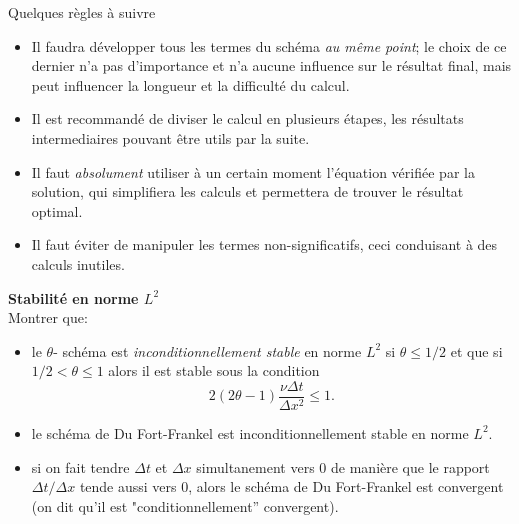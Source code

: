 \documentclass[12pt,a4paper]{article}
\begin{document}
\begin{enumerate}
Quelques r\`egles \`a suivre 
\begin{itemize}
\item Il faudra d\'evelopper tous les termes du sch\'ema {\it au
    m\^eme point}; le choix de ce dernier n'a pas d'importance et n'a
  aucune influence sur le r\'esultat final, mais peut influencer la
  longueur et la difficult\'e du calcul.
\item Il est recommand\'e de diviser le calcul en plusieurs \'etapes,
  les r\'esultats intermediaires pouvant \^etre utils par la suite.
\item Il faut {\it absolument} utiliser \`a un certain moment
  l'\'equation v\'erifi\'ee par la solution, qui simplifiera les
  calculs et permettera de trouver le r\'esultat optimal.
\item Il faut \'eviter de manipuler les termes non-significatifs, ceci
  conduisant \`a des calculs inutiles.
\end{itemize}

{\bf Stabilit\'e en norme $L^2$}\\
Montrer que:
\begin{itemize}
\item le $\theta$- sch\'ema est
{\it inconditionnellement stable} en norme $L^2$ si $\theta \le 1/2$ et que si $1/2 < \theta \le 1$ alors il est
stable sous la condition $$2(2\theta-1)\frac{\nu\Delta
    t}{\Delta x^2} \le 1.$$ 
    \item le sch\'ema de Du Fort-Frankel est inconditionnellement
stable en norme $L^2$.
\item si on fait tendre $\Delta t$ et
$\Delta x$ simultanement vers $0$ de mani\`ere que le rapport $\Delta
t/\Delta x$ tende aussi vers $0$, alors le sch\'ema de Du Fort-Frankel
est convergent (on dit qu'il est "conditionnellement'' convergent).  
\end{itemize}



\end{enumerate}

\end{document}
